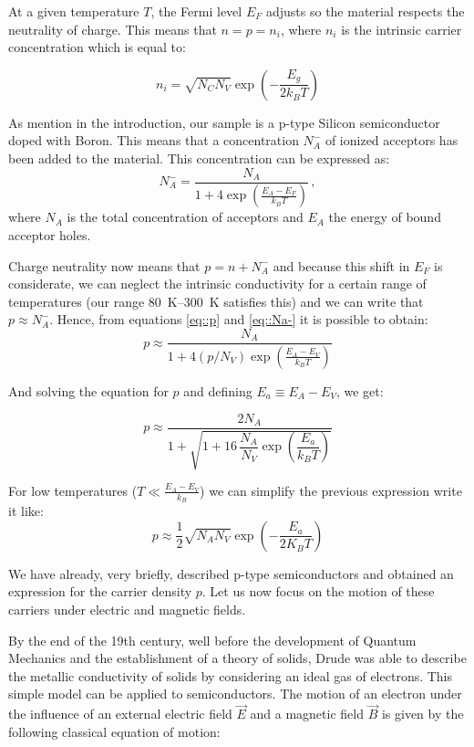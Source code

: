 \documentclass[11pt,a4paper]{article}
\begin{document}
At a given temperature $T$, the Fermi level $E_F$ adjusts so the material respects the neutrality of charge. This means that $n=p=n_i$, where $n_i$ is the intrinsic carrier concentration which is equal to:

\begin{equation}\label{eq:ni}
n_i=\sqrt{N_CN_V}\exp\left(-\frac{E_g}{2k_BT}\right)
\end{equation}

As mention in the introduction, our sample is a p-type Silicon semiconductor doped with Boron. This means that a concentration $N_A^-$ of ionized acceptors has been added to the material. This concentration can be expressed as:
\begin{equation}\label{eq::Na-}
N_A^-=\frac{N_A}{1+4\exp\left(\frac{E_A-E_F}{k_BT}\right)}\,,
\end{equation}
where $N_A$ is the total concentration of acceptors and $E_A$ the energy of bound acceptor holes.

Charge neutrality now means that $p=n+N_A^-$ and because this shift in $E_F$ is considerate, we can neglect the intrinsic conductivity for a certain range of temperatures (our range \SIrange{80}{300}{\kelvin} satisfies this) and we can write that $p\approx N_A^-$. Hence, from equations \eqref{eq::p} and \eqref{eq::Na-} it is possible to obtain:
\begin{equation*}
p\approx\frac{N_A}{1+4(p/N_V)\exp\left(\frac{E_A-E_V}{k_BT}\right)}
\end{equation*}

And solving the equation for $p$ and defining $E_a\equiv E_A-E_V$, we get:

\begin{equation}\label{eq:p_final}
p\approx\frac{2N_A}{1+\sqrt{1+16\,\dfrac{N_A}{N_V}\exp\left(\dfrac{E_a}{k_BT}\right)}}
\end{equation}

For low temperatures ($T\ll\frac{E_A-E_V}{k_B}$) we can simplify the previous expression write it like:
\begin{equation}\label{eq:p_final_approx}
p\approx \frac{1}{2}\sqrt{N_AN_V}\exp\left(-\frac{E_a}{2K_BT}\right)
\end{equation}

We have already, very briefly, described p-type semiconductors and obtained an expression for the carrier density $p$. Let us now focus on the motion of these carriers under electric and magnetic fields.

By the end of the 19th century, well before the development of Quantum Mechanics and the establishment of a theory of solids, Drude was able to describe the metallic conductivity of solids by considering an ideal gas of electrons. This simple model can be applied to semiconductors. The motion of an electron under the influence of an external electric field $\vec{E}$ and a magnetic field $\vec{B}$ is given by the following classical equation of motion:
\end{document}
